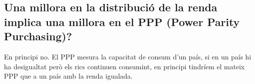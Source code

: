 \subsection{Una millora en la distribució de la renda implica una millora 
en el PPP (Power Parity Purchasing)?}

En principi no. El PPP mesura la capacitat de consum d'un país, si en un
país hi ha desigualtat però els rics continuen consumint, en principi 
tindríem el mateix PPP que a un país amb la renda igualada.
